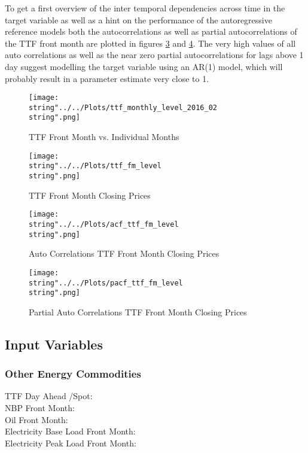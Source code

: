 To get a first overview of the inter temporal dependencies across time in the target variable as well as a hint on the performance of the autoregressive reference models both the autocorrelations  as well as partial autocorrelations of the TTF front month are plotted in figures \ref{fig:acf_ttf_fm_level} and \ref{fig:pacf_ttf_fm_level}. The very high values of all auto correlations as well as the near zero partial autocorrelations for lags above 1 day suggest modelling the target variable using an AR(1) model, which will probably result in a parameter estimate very close to 1. 

\begin{figure}
  \centering
\texttt{[image: \\string"../../Plots/ttf\_monthly\_level\_2016\_02\\string".png]}
  \caption{TTF Front Month vs. Individual Months}\label{fig:ttf_monthly_level_2016_02}
\end{figure}



\begin{figure}
  \centering
\texttt{[image: \\string"../../Plots/ttf\_fm\_level\\string".png]}
  \caption{TTF Front Month Closing Prices}\label{fig:ttf_fm_level}
\end{figure}


\begin{figure}
  \centering
\texttt{[image: \\string"../../Plots/acf\_ttf\_fm\_level\\string".png]}
  \caption{Auto Correlations TTF Front Month Closing Prices}\label{fig:acf_ttf_fm_level}
\end{figure}

\begin{figure}
  \centering
\texttt{[image: \\string"../../Plots/pacf\_ttf\_fm\_level\\string".png]}
  \caption{Partial Auto Correlations TTF Front Month Closing Prices}\label{fig:pacf_ttf_fm_level}
\end{figure}

\subsection{Input Variables}\label{Sec:Input}
\subsubsection{Other Energy Commodities}
\begin{description}
\item[TTF Day Ahead /Spot:]
\item[NBP Front Month:]
\item[Oil Front Month:]
\item[Electricity Base Load Front Month:]
\item[Electricity Peak Load Front Month:]
\end{description}
